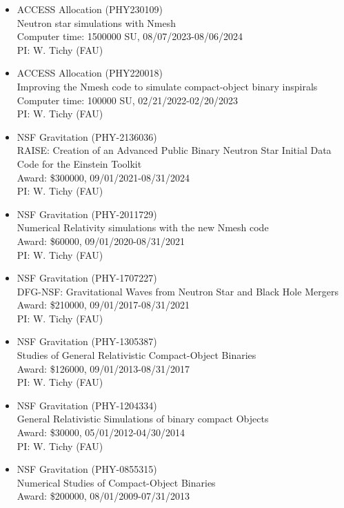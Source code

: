 \documentclass[11pt]{article}
\begin{document}
\begin{itemize}
\item	ACCESS Allocation (PHY230109)\\
	Neutron star simulations with Nmesh\\
	Computer time: 1500000 SU, 08/07/2023-08/06/2024\\
	PI: W. Tichy (FAU)
\item	ACCESS Allocation (PHY220018)\\
	Improving the Nmesh code to simulate compact-object binary inspirals\\
	Computer time: 100000 SU, 02/21/2022-02/20/2023\\
	PI: W. Tichy (FAU)
\item	NSF Gravitation (PHY-2136036)\\
	RAISE: Creation of an Advanced Public Binary Neutron Star
	Initial Data Code for the Einstein Toolkit\\
	Award: \$300000, 09/01/2021-08/31/2024\\
	PI: W. Tichy (FAU)
\item	NSF Gravitation (PHY-2011729)\\
	Numerical Relativity simulations with the new Nmesh code\\
	Award: \$60000, 09/01/2020-08/31/2021\\
	PI: W. Tichy (FAU)
\item	NSF Gravitation (PHY-1707227)\\
	DFG-NSF: Gravitational Waves from Neutron Star and Black Hole Mergers\\
	Award: \$210000, 09/01/2017-08/31/2021\\
	PI: W. Tichy (FAU)
\item	NSF Gravitation (PHY-1305387)\\
	Studies of General Relativistic Compact-Object Binaries\\
	Award: \$126000, 09/01/2013-08/31/2017\\
	PI: W. Tichy (FAU)
\item	NSF Gravitation (PHY-1204334)\\
	General Relativistic Simulations of binary compact Objects\\
	Award: \$30000, 05/01/2012-04/30/2014\\
	PI: W. Tichy (FAU)
\item	NSF Gravitation (PHY-0855315)\\
	Numerical Studies of Compact-Object Binaries\\
	Award: \$200000, 08/01/2009-07/31/2013\\

\end{itemize}
\end{document}
